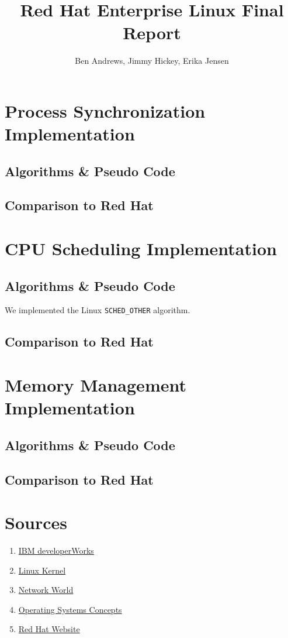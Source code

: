 \documentclass[12pt]{article}
\title{Red Hat Enterprise Linux Final Report}
\author{Ben Andrews, Jimmy Hickey, Erika Jensen}
\begin{document}
\maketitle
\tableofcontents
\clearpage

\doublespacing

\section{Process Synchronization Implementation}
\subsection{Algorithms \& Pseudo Code}


\subsection{Comparison to Red Hat }

\section{CPU Scheduling Implementation}
\subsection{Algorithms \& Pseudo Code}
We implemented the Linux \lstinline|SCHED_OTHER| algorithm.
\subsection{Comparison to Red Hat}

\section{Memory Management Implementation}
\subsection{Algorithms \& Pseudo Code}

\subsection{Comparison to Red Hat}

\pagebreak
\section*{Sources}
\singlespacing
\begin{enumerate}
\item\href{https://www.ibm.com/developerworks/learn/}{IBM developerWorks}
\item\href{https://github.com/torvalds/linux}{Linux Kernel}
\item\href{https://www.networkworld.com/article/2597777/software/162275-10-things-you-need-to-know-about-Red-Hat-Enterprise-Linux-7.html}{Network World}
\item\href{https://www.amazon.com/Operating-System-Concepts-Abraham-Silberschatz/dp/1118129385}{Operating Systems Concepts}
\item\href{https://access.redhat.com/}{Red Hat Website}
\end{enumerate}
\end{document}
